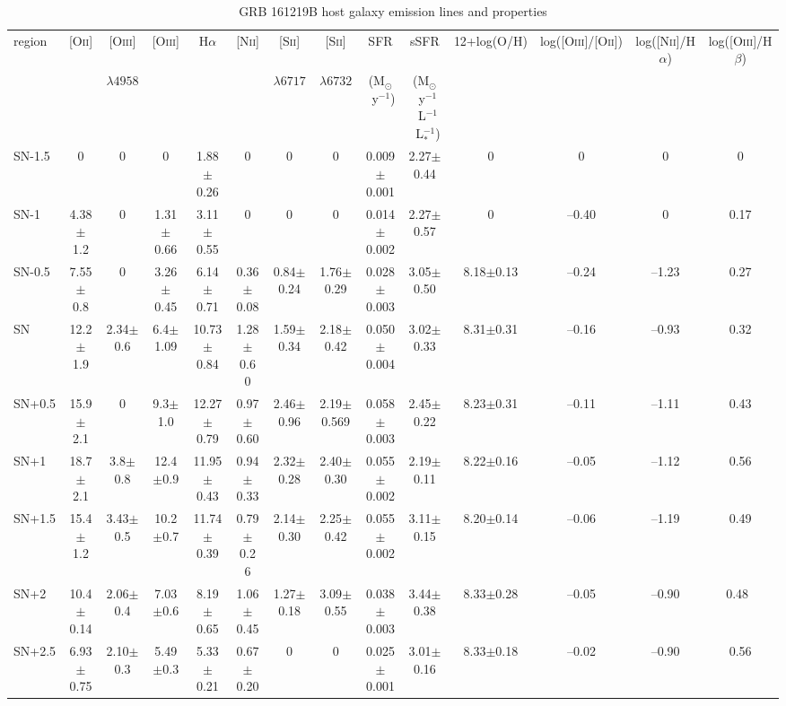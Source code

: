 \documentclass[traditabstract,longauth]{aa}
\begin{document}
\begin{table}
\scriptsize
\centering
\setlength{\tabcolsep}{1pt}
\setlength{\extrarowheight}{2pt}
\caption{GRB 161219B host galaxy emission lines and properties}
\label{table:host_emlines}
\begin{tabular}{lccccccccccccc}
\hline																
region &	[O\textsc{ii}] 	& [O\textsc{iii}]			& [O\textsc{iii}]	&	H$\alpha$	& [N\textsc{ii}] 	& [S\textsc{ii}]	& [S\textsc{ii}] & SFR   & sSFR & 12+log(O/H)	& log([O\textsc{iii}]/[O\textsc{ii}]) & log([N\textsc{ii}]/H$\alpha$) & log([O\textsc{iii}]/H$\beta$) \\
	&				&$\lambda4958$	&		&				&			&$\lambda6717$		&$\lambda6732$	& (M$_{\odot}$~y$^{-1}$) & (M$_{\odot}$~y$^{-1}$~L$^{-1}$~L$_{*}^{-1}$)&		&			&		&		\\ \hline
SN-1.5&	0			&0				 &0			&	1.88$\pm$0.26&0			&0				 &	0		    	  & 0.009$\pm$0.001 & 2.27$\pm$0.44	&0				&0			&0		&0			\\
SN-1	&4.38$\pm$1.2		&0				&1.31$\pm$0.66&	3.11$\pm$0.55	&0			&0				&0				&0.014$\pm$0.002	& 2.27$\pm$0.57	&0				&--0.40		&0		&0.17		\\
SN-0.5&7.55$\pm$0.8	&0				&3.26$\pm$0.45&	6.14$\pm$0.71	&0.36$\pm$0.08&0.84$\pm$0.24	&1.76$\pm$0.29	&0.028$\pm$0.003	& 3.05$\pm$0.50	&8.18$\pm$0.13	&--0.24		&--1.23	&	0.27\\
SN&	12.2$\pm$1.9		&2.34$\pm$0.6		&6.4$\pm$1.09	&	10.73$\pm$0.84	&1.28$\pm$0.6	0 &1.59$\pm$0.34	&2.18$\pm$0.42	&0.050$\pm$0.004	& 3.02$\pm$0.33	&8.31$\pm$0.31	&--0.16		&--0.93	&	0.32\\
SN+0.5&15.9$\pm$2.1	&0				& 9.3$\pm$1.0	&	12.27$\pm$0.79	&0.97$\pm$0.60  &2.46$\pm$0.96	&2.19$\pm$0.569	&0.058$\pm$0.003	& 2.45$\pm$0.22	&8.23$\pm$0.31	&--0.11		&--1.11	&	0.43	\\
SN+1&18.7$\pm$2.1	&3.8$\pm$0.8		&12.4$\pm$0.9	&	11.95$\pm$0.43	&0.94$\pm$0.33 &2.32$\pm$0.28	&2.40$\pm$0.30	&0.055$\pm$0.002	& 2.19$\pm$0.11	&8.22$\pm$0.16	&--0.05		&--1.12	&0.56 \\	
SN+1.5&15.4$\pm$1.2	&3.43$\pm$0.5		&10.2$\pm$0.7	&	11.74$\pm$0.39	&0.79$\pm$0.2	6  &2.14$\pm$0.30	&2.25$\pm$0.42		&0.055$\pm$0.002	& 3.11$\pm$0.15	&8.20$\pm$0.14	&--0.06		&--1.19	&0.49 \\
SN+2&10.4$\pm$0.14	&2.06$\pm$0.4 	&7.03$\pm$0.6	&	8.19$\pm$0.65	&1.06$\pm$0.45&1.27$\pm$0.18	&3.09$\pm$0.55		&0.038$\pm$0.003	& 3.44$\pm$0.38	&8.33$\pm$0.28	&--0.05		&--0.90	&0.48 \\
SN+2.5&6.93$\pm$0.75	&2.10$\pm$0.3		&5.49$\pm$0.3	&	5.33$\pm$0.21	&0.67$\pm$0.20&0				&0				&0.025$\pm$0.001	& 3.01$\pm$0.16	&8.33$\pm$0.18	&--0.02		&--0.90	&0.56 \\

\end{tabular}
\end{table}
\end{document}
